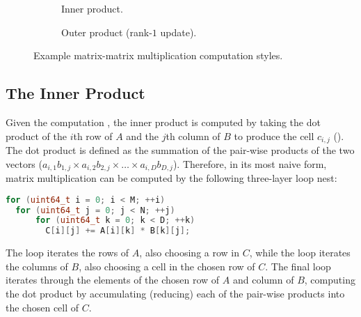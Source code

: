 \documentclass[\main/thesis.tex]{subfiles}
\begin{document}
\begin{figure}[t]
 \hfill
  \begin{subfigure}{.45\linewidth}
    \centering
    \caption{Inner product.}
    \label{fig:innerProduct}
  \end{subfigure}
 \hfill
  \begin{subfigure}{.45\linewidth}
    \centering
  \caption{Outer product (rank-$1$ update).}
    \label{fig:outerProduct}
  \end{subfigure}
  \hfill
  \caption{Example matrix-matrix multiplication computation styles.}
  \label{fig:product}
  \vspace{-0.15cm}
\end{figure}

\subsection{The Inner Product}
Given the computation , the inner product is computed by taking the dot product of the $i$th row of $A$ and the $j$th column of $B$ to produce the cell $c_{i,j}$ ().
The dot product is defined as the summation of the pair-wise products of the two vectors (\eg $a_{i,1}b_{1,j} \times a_{i,2}b_{2,j} \times \ldots \times a_{i,D}b_{D,j}$).
Therefore, in its most naive form, matrix multiplication can be computed by the following three-layer loop nest:
\begin{lstlisting}[caption={[Basic inner product]A basic matrix multiplication via inner product.},label=lst:basicInner,language=C++,columns=flexible,morekeywords=uint64_t]
for (uint64_t i = 0; i < M; ++i)
  for (uint64_t j = 0; j < N; ++j)
      for (uint64_t k = 0; k < D; ++k)
        C[i][j] += A[i][k] * B[k][j];
\end{lstlisting}
The  loop iterates the rows of $A$, also choosing a row in $C$, while the  loop iterates the columns of $B$, also choosing a cell in the chosen row of $C$.
The final  loop iterates through the elements of the chosen row of $A$ and column of $B$, computing the dot product by accumulating (reducing) each of the pair-wise products into the chosen cell of $C$.
\end{document}
